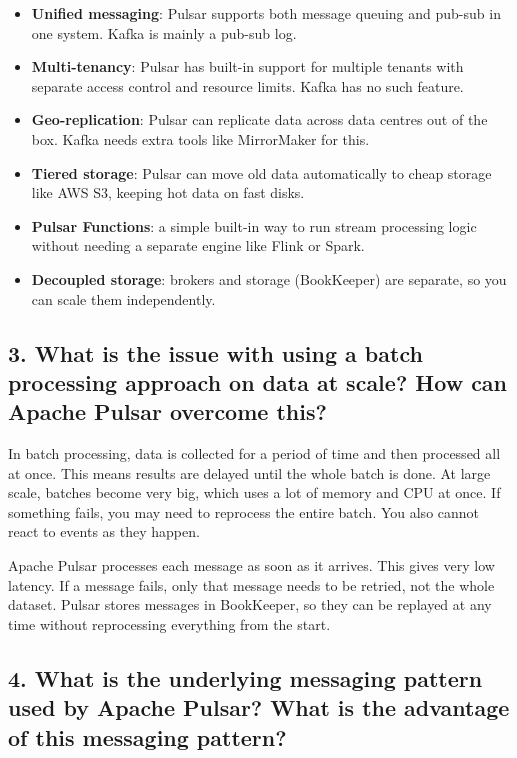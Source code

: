 \documentclass[11pt,a4paper]{article}
\begin{document}
\begin{itemize}[leftmargin=1.5cm]
  \item \textbf{Unified messaging}: Pulsar supports both message queuing and pub-sub in
        one system. Kafka is mainly a pub-sub log.
  \item \textbf{Multi-tenancy}: Pulsar has built-in support for multiple tenants with
        separate access control and resource limits. Kafka has no such feature.
  \item \textbf{Geo-replication}: Pulsar can replicate data across data centres out of the
        box. Kafka needs extra tools like MirrorMaker for this.
  \item \textbf{Tiered storage}: Pulsar can move old data automatically to cheap storage
        like AWS S3, keeping hot data on fast disks.
  \item \textbf{Pulsar Functions}: a simple built-in way to run stream processing logic
        without needing a separate engine like Flink or Spark.
  \item \textbf{Decoupled storage}: brokers and storage (BookKeeper) are separate, so
        you can scale them independently.
\end{itemize}

\subsection*{3. What is the issue with using a batch processing approach on data at scale? How can Apache Pulsar overcome this?}

In batch processing, data is collected for a period of time and then processed all at once.
This means results are delayed until the whole batch is done. At large scale, batches
become very big, which uses a lot of memory and CPU at once. If something fails, you may
need to reprocess the entire batch. You also cannot react to events as they happen.

Apache Pulsar processes each message as soon as it arrives. This gives very low latency.
If a message fails, only that message needs to be retried, not the whole dataset. Pulsar
stores messages in BookKeeper, so they can be replayed at any time without reprocessing
everything from the start.

\subsection*{4. What is the underlying messaging pattern used by Apache Pulsar? What is the advantage of this messaging pattern?}
\end{document}
